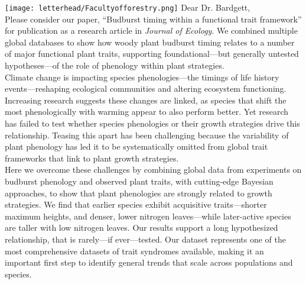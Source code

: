 \documentclass[11pt,a4paper]{article}
\begin{document}
\noindent \texttt{[image: letterhead/Facultyofforestry.png]}
\noindent Dear Dr. Bardgett,
\vspace{1.5ex}\\
\noindent Please consider our paper, ``Budburst timing within a functional trait framework'' for publication as a research article in \emph{Journal of Ecology}. We combined multiple global databases to show how woody plant budburst timing relates to a number of major functional plant traits, supporting foundational---but generally untested hypotheses---of the role of phenology within plant strategies. 
\vspace{1.5ex}\\ 
\noindent Climate change is impacting species phenologies---the timings of life history events---reshaping ecological communities and altering ecosystem functioning. Increasing research suggests these changes are linked, as species that shift the most phenologically with warming appear to also perform better. Yet research has failed to test whether species phenologies or their growth strategies drive this relationship. Teasing this apart has been challenging because the variability of plant phenology has led it to be systematically omitted from global trait frameworks that link to plant growth strategies. %
\vspace{1.5ex}\\
Here we overcome these challenges by combining global data from experiments on budburst phenology and observed plant traits, with cutting-edge Bayesian approaches, to show that plant phenologies are strongly related to growth strategies. We find that earlier species exhibit acquisitive traits---shorter maximum heights, and denser, lower nitrogen leaves---while later-active species are taller with low nitrogen leaves. Our results support a long hypothesized relationship, that is rarely---if ever---tested. Our dataset represents one of the most comprehensive datasets of trait syndromes available, making it an important first step to identify general trends that scale across populations and species. 
\vspace{1.5ex}\\
\end{document}
